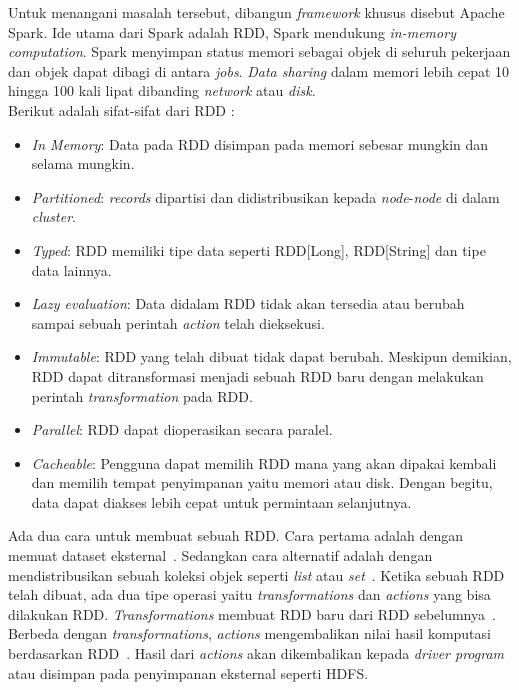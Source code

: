 Untuk menangani masalah tersebut, dibangun \textit{framework} khusus disebut Apache Spark. Ide utama dari Spark adalah RDD, Spark mendukung \textit{in-memory computation}. Spark menyimpan status memori sebagai objek di seluruh pekerjaan dan objek dapat dibagi di antara \textit{jobs}. \textit{Data sharing} dalam memori lebih cepat 10 hingga 100 kali lipat dibanding \textit{network} atau \textit{disk}.\\

Berikut adalah sifat-sifat dari RDD :
\begin{itemize}

\item \textit{In Memory}: Data pada RDD disimpan pada memori sebesar mungkin dan selama mungkin.

\item \textit{Partitioned}: \textit{records} dipartisi dan didistribusikan kepada \textit{node}-\textit{node} di dalam \textit{cluster}.

\item \textit{Typed}: RDD memiliki tipe data seperti RDD[Long], RDD[String] dan tipe data lainnya.

\item \textit{Lazy evaluation}: Data didalam RDD tidak akan tersedia atau berubah sampai sebuah perintah \textit{action} telah dieksekusi.

\item \textit{Immutable}: RDD yang telah dibuat tidak dapat berubah. Meskipun demikian, RDD
dapat ditransformasi menjadi sebuah RDD baru dengan melakukan perintah \textit{transformation}
pada RDD.

\item \textit{Parallel}: RDD dapat dioperasikan secara paralel.

\item \textit{Cacheable}: Pengguna dapat memilih RDD mana yang akan dipakai kembali dan memilih tempat penyimpanan yaitu memori atau disk. Dengan begitu, data dapat diakses lebih cepat untuk permintaan selanjutnya.\\

\end{itemize}

Ada dua cara untuk membuat sebuah RDD. Cara pertama adalah dengan memuat dataset eksternal~\cite{holdenkarau:07:ls}. Sedangkan cara alternatif adalah dengan mendistribusikan sebuah koleksi objek seperti \textit{list} atau \textit{set}~\cite{holdenkarau:07:ls}. Ketika sebuah RDD telah dibuat, ada dua tipe operasi yaitu \textit{transformations} dan \textit{actions} yang bisa dilakukan RDD. \textit{Transformations} membuat RDD baru dari RDD sebelumnya~\cite{holdenkarau:07:ls}. Berbeda dengan \textit{transformations}, \textit{actions} mengembalikan nilai hasil komputasi berdasarkan RDD~\cite{holdenkarau:07:ls}. Hasil dari \textit{actions} akan dikembalikan kepada \textit{driver program} atau disimpan pada penyimpanan eksternal seperti HDFS. \\

